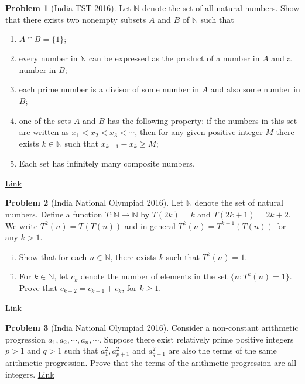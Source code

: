 \documentclass[]{article}
\theoremstyle{definition}
\newtheorem{problem}{Problem}
\begin{document}
\begin{problem}[India TST 2016]
	Let $\mathbb N$ denote the set of all natural numbers. Show that there exists two nonempty subsets $A$ and $B$ of $\mathbb N$ such that
		\begin{enumerate}
			\item $A\cap B=\{1\};$
			\item every number in $\mathbb N$ can be expressed as the product of a number in $A$ and a number in $B$;
			\item each prime number is a divisor of some number in $A$ and also some number in $B$;
			\item one of the sets $A$ and $B$ has the following property: if the numbers in this set are written as $x_1<x_2<x_3<\cdots$, then for any given positive integer $M$ there exists $k\in \mathbb N$ such that $x_{k+1}-x_k\ge M$;
			\item Each set has infinitely many composite numbers.
		\end{enumerate}
	\flushright \href{http://artofproblemsolving.com/community/c6h1276405p6696414}{Link}
\end{problem}




\begin{problem}[India National Olympiad 2016]
	Let $\mathbb{N}$ denote the set of natural numbers. Define a function $T:\mathbb{N}\rightarrow\mathbb{N}$ by $T(2k)=k$ and $T(2k+1)=2k+2$. We write $T^2(n)=T(T(n))$ and in general $T^k(n)=T^{k-1}(T(n))$ for any $k>1$.
		\begin{enumerate}[(i)]
			\item Show that for each $n\in\mathbb{N}$, there exists $k$ such that $T^k(n)=1$.
			\item For $k\in\mathbb{N}$, let $c_k$ denote the number of elements in the set $\{n: T^k(n)=1\}$. Prove that $c_{k+2}=c_{k+1}+c_k$, for $k\ge 1$.
		\end{enumerate}
	\flushright \href{http://artofproblemsolving.com/community/c6h1186108p5763326}{Link}
\end{problem}





\begin{problem}[India National Olympiad 2016]
	Consider a non-constant arithmetic progression $a_1, a_2,\cdots, a_n,\cdots$. Suppose there exist relatively prime positive integers $p>1$ and $q>1$ such that $a_1^2, a_{p+1}^2$ and $a_{q+1}^2$ are also the terms of the same arithmetic progression. Prove that the terms of the arithmetic progression are all integers. \hfill \href{http://artofproblemsolving.com/community/c6h1186114p5763347}{Link}
\end{problem}
\end{document}
